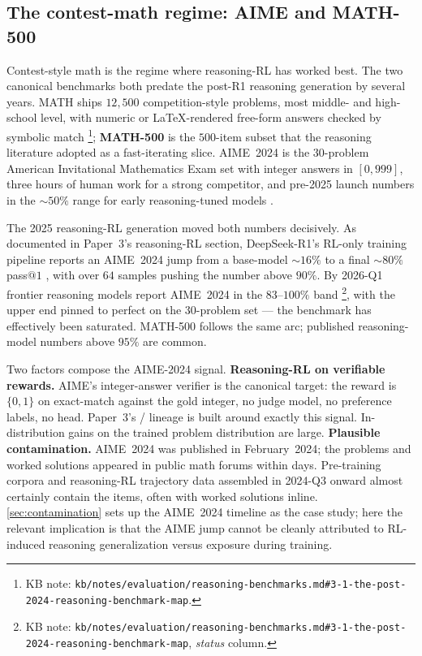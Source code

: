 \subsection{The contest-math regime: AIME and MATH-500}
\label{sec:reasoning-aime}

Contest-style math is the regime where reasoning-RL has worked best.
The two canonical benchmarks both predate the post-R1 reasoning
generation by several years. MATH 
ships $12{,}500$ competition-style problems, most middle- and
high-school level, with numeric or LaTeX-rendered free-form answers
checked by symbolic match%
\footnote{KB note: \nolinkurl{kb/notes/evaluation/reasoning-benchmarks.md#3-1-the-post-2024-reasoning-benchmark-map}.};
\textbf{MATH-500} is the $500$-item subset that the reasoning literature
adopted as a fast-iterating slice. AIME~2024 is the $30$-problem
American Invitational Mathematics Exam set with integer answers in
$[0, 999]$, three hours of human work for a strong competitor, and
pre-2025 launch numbers in the $\sim 50\%$ range for early
reasoning-tuned models .

The 2025 reasoning-RL generation moved both numbers decisively. As
documented in Paper~3's reasoning-RL section,
DeepSeek-R1's RL-only training
pipeline reports an AIME~2024 jump from a base-model $\sim 16\%$ to
a final $\sim 80\%$ pass$@1$
, with  over $64$ samples
pushing the number above $90\%$. By 2026-Q1 frontier reasoning models
report AIME~2024 in the $83$--$100\%$ band%
\footnote{KB note: \nolinkurl{kb/notes/evaluation/reasoning-benchmarks.md#3-1-the-post-2024-reasoning-benchmark-map}, \emph{ status} column.},
with the upper end pinned to perfect on the $30$-problem set --- the
benchmark has effectively been saturated. MATH-500 follows the same
arc; published reasoning-model numbers above $95\%$ are common.

Two factors compose the AIME-2024  signal.
\textbf{Reasoning-RL on verifiable rewards.} AIME's integer-answer
verifier is the canonical  target: the reward is $\{0, 1\}$ on
exact-match against the gold integer, no judge model, no
preference labels, no  head. Paper~3's / lineage
\citep[\S 3]{shao2024,dapo2025} is built around
exactly this signal. In-distribution gains on the trained problem
distribution are large.
\textbf{Plausible contamination.} AIME~2024 was published in
February~2024; the problems and worked solutions appeared in public
math forums within days. Pre-training corpora and reasoning-RL
trajectory data assembled in 2024-Q3 onward almost certainly contain
the items, often with worked solutions inline. \cref{sec:contamination}
sets up the AIME~2024 timeline as the case study; here the relevant
implication is that the AIME jump cannot be cleanly attributed to
RL-induced reasoning generalization versus exposure during training.

